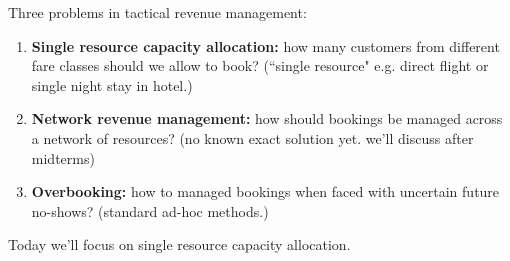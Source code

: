 Three problems in tactical revenue management:

\begin{enumerate}

\item \textbf{Single resource capacity allocation:} how many customers from different fare classes should we allow to book? (``single resource" e.g. direct flight or single night stay in hotel.)

\item \textbf{Network revenue management:} how should bookings be managed across a network of resources? (no known exact solution yet. we'll discuss after midterms)

\item \textbf{Overbooking:} how to managed bookings when faced with uncertain future no-shows? (standard ad-hoc methods.)

\end{enumerate}

Today we'll focus on single resource capacity allocation.

